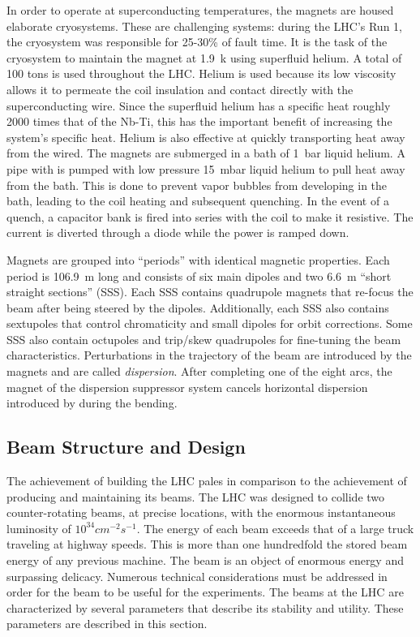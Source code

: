 In order to operate at superconducting temperatures, the magnets are housed elaborate cryosystems.
These are challenging systems: during the LHC's Run 1, the cryosystem was responsible for 25-30\% of fault time.\cite{lhcRun1}
It is the task of the cryosystem to maintain the magnet at 1.9~k using superfluid helium. A total of 100 tons is used throughout the LHC.
Helium is used because its low viscosity allows it to permeate the coil insulation and contact directly with the superconducting wire.
Since the superfluid helium has a specific heat roughly 2000 times that of the Nb-Ti, this has the important benefit of increasing the system's specific heat.
Helium is also effective at quickly transporting heat away from the wired.
The magnets are submerged in a bath of 1~bar liquid helium. A pipe with is pumped with low pressure 15~mbar liquid helium to pull heat away from the bath.
This is done to prevent vapor bubbles from developing in the bath, leading to the coil heating and subsequent quenching.
In the event of a quench, a capacitor bank is fired into series with the coil to make it resistive. The current is diverted through a diode while the power is ramped down.

Magnets are grouped into ``periods'' with identical magnetic properties.
Each period is 106.9~m long and consists of six main dipoles and two 6.6~m ``short straight sections'' (SSS).
Each SSS contains quadrupole magnets that re-focus the beam after being steered by the dipoles.
Additionally, each SSS also contains sextupoles that control chromaticity and small dipoles for orbit corrections.
Some SSS also contain octupoles and trip/skew quadrupoles for fine-tuning the beam characteristics.
Perturbations in the trajectory of the beam are introduced by the magnets and are called \emph{dispersion}.
After completing one of the eight arcs, the magnet of the dispersion suppressor system cancels horizontal dispersion introduced by during the bending.

\subsection{Beam Structure and Design}
The achievement of building the LHC pales in comparison to the achievement of producing and maintaining its beams.
The LHC was designed to collide two counter-rotating beams, at precise locations, with the enormous instantaneous luminosity of $10^{34}cm^{-2}s^{-1}$.
The energy of each beam exceeds that of a large truck traveling at highway speeds.
This is more than one hundredfold the stored beam energy of any previous machine. \cite{lyndon}
The beam is an object of enormous energy and surpassing delicacy.
Numerous technical considerations must be addressed in order for the beam to be useful for the experiments.
The beams at the LHC are characterized by several parameters that describe its stability and utility.
These parameters are described in this section.

